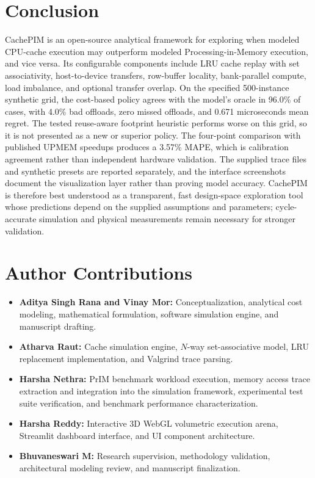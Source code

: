 \documentclass[journal,10pt,twocolumn]{IEEEtran}
\begin{document}
\section{Conclusion}
CachePIM is an open-source analytical framework for exploring when modeled CPU-cache execution may outperform modeled Processing-in-Memory execution, and vice versa. Its configurable components include LRU cache replay with set associativity, host-to-device transfers, row-buffer locality, bank-parallel compute, load imbalance, and optional transfer overlap. On the specified 500-instance synthetic grid, the cost-based policy agrees with the model's oracle in 96.0\% of cases, with 4.0\% bad offloads, zero missed offloads, and 0.671 microseconds mean regret. The tested reuse-aware footprint heuristic performs worse on this grid, so it is not presented as a new or superior policy. The four-point comparison with published UPMEM speedups produces a 3.57\% MAPE, which is calibration agreement rather than independent hardware validation. The supplied trace files and synthetic presets are reported separately, and the interface screenshots document the visualization layer rather than proving model accuracy. CachePIM is therefore best understood as a transparent, fast design-space exploration tool whose predictions depend on the supplied assumptions and parameters; cycle-accurate simulation and physical measurements remain necessary for stronger validation.

\section*{Author Contributions}
\begin{itemize}
    \item \textbf{Aditya Singh Rana and Vinay Mor:} Conceptualization, analytical cost modeling, mathematical formulation, software simulation engine, and manuscript drafting.
    \item \textbf{Atharva Raut:} Cache simulation engine, $N$-way set-associative model, LRU replacement implementation, and Valgrind trace parsing.
    \item \textbf{Harsha Nethra:} PrIM benchmark workload execution, memory access trace extraction and integration into the simulation framework, experimental test suite verification, and benchmark performance characterization.
    \item \textbf{Harsha Reddy:} Interactive 3D WebGL volumetric execution arena, Streamlit dashboard interface, and UI component architecture.
    \item \textbf{Bhuvaneswari M:} Research supervision, methodology validation, architectural modeling review, and manuscript finalization.
\end{itemize}
\end{document}

